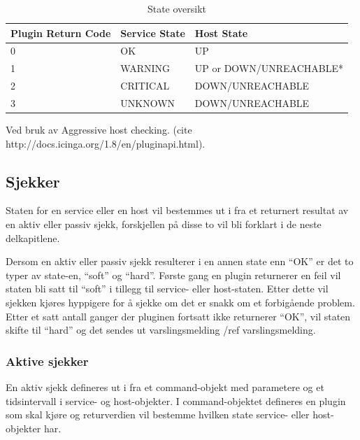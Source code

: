 \begin{table}
	\begin{center}
	\begin{threeparttable}
	\begin{tabular}{ | l | l | l |} \hline
    \textbf{Plugin Return Code} & \textbf{Service State} & \textbf{Host State} \\ \hline
	0 & OK & UP \\ \hline
	1 & WARNING & UP or DOWN/UNREACHABLE* \\ \hline
	2 & CRITICAL & DOWN/UNREACHABLE \\ \hline
	3 & UNKNOWN & DOWN/UNREACHABLE \\ \hline

	\end{tabular}
	\begin{tablenotes}
	\small
	\item *Ved bruk av Aggressive host checking. (cite http://docs.icinga.org/1.8/en/pluginapi.html).
	\end{tablenotes}
	\caption{State oversikt}
	\label{state}
	\end{threeparttable}
	\end{center}
\end{table}

\subsection{Sjekker}
Staten for en service eller en host vil bestemmes ut i fra et returnert resultat av en aktiv eller passiv sjekk, forskjellen på disse to vil bli forklart i de neste delkapitlene.

Dersom en aktiv eller passiv sjekk resulterer i en annen state enn “OK” er det to typer av state-en, “soft” og “hard”. Første gang en plugin returnerer en feil vil staten bli satt til “soft” i tillegg til service- eller host-staten. Etter dette vil sjekken kjøres hyppigere for å sjekke om det er snakk om et forbigående problem. Etter et satt antall ganger der pluginen fortsatt ikke returnerer “OK”, vil staten skifte til “hard” og det sendes ut varslingsmelding /ref {varslingsmelding}.

\subsubsection{Aktive sjekker}
En aktiv sjekk defineres ut i fra et command-objekt med parametere og et tidsintervall i service- og host-objekter. I command-objektet defineres en plugin som skal kjøre og returverdien vil bestemme hvilken state service- eller host-objekter har. 

